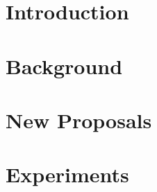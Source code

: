 \documentclass[ twoside,openright,titlepage,numbers=noenddot,headinclude,%
                footinclude=true,cleardoublepage=empty,abstractoff, %
                BCOR=5mm,paper=a4,fontsize=11pt,%
                american,%
                ]{scrreprt}
\begin{document}
	\frenchspacing
	\raggedbottom
	\pagestyle{plain}
	
	
	
	\cleardoublepage
	\cleardoublepage
	\cleardoublepage
	\cleardoublepage
	\cleardoublepage
	\cleardoublepage
	\pagestyle{scrheadings}
	\cleardoublepage
	\part{Introduction}\label{pt:introduction}
	
	\part{Background}\label{pt:background}
	
	
	\part{New Proposals}\label{pt:NewProposals}
	
	\part{Experiments}\label{pt:Experiments}
	
	



	\cleardoublepage
	\cleardoublepage
	\cleardoublepage
\end{document}
